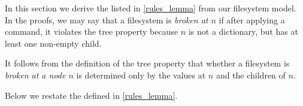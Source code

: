 
In this section we derive the  listed in
\cref{rules_lemma} from our filesystem model.
In the proofs, we may say that a filesystem
is \emph{broken at $n$}
if after applying a command, it violates the tree property
because
$n$ is not a dictionary, but has at least one non-empty child.

% 

It follows from the definition of the tree property that
whether a filesystem is \emph{broken at a node $n$} is determined only
by the values at $n$ and the children of $n$.
% 

Below we restate the  defined in
\cref{rules_lemma}.

\begin{myaxproof}
\axaxseparatecommute
\end{myaxproof}

